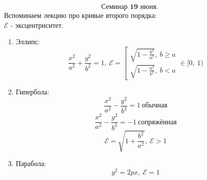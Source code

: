 \documentclass[12pt, letterpaper, twoside]{article}
\begin{document}
\[\textbf{Семинар 19 июня.}\]
Вспоминаем лекцию про кривые второго порядка:\\
$\mathcal{E}$ - эксцентриситет.
\begin{enumerate}
    \item Эллипс:
\[\frac{x^2}{a^2} + \frac{y^2}{b^2} = 1,\ \mathcal{E} = \left[ \begin{gathered}
    \sqrt{1 - \frac{b^2}{a^2}},\ b\geq a\\
    \sqrt{1 - \frac{a^2}{b^2}},\ b < a
\end{gathered}\right. \in [0,\ 1)\]
    \newpage
    \item Гипербола:
\[\frac{x^2}{a^2} - \frac{y^2}{b^2} = 1\ \text{обычная}\]
\[\frac{x^2}{a^2} - \frac{y^2}{b^2} = -1\ \text{сопряжённая}\]
\[\mathcal{E} = \sqrt{1 + \frac{b^2}{a^2}},\ \mathcal{E} > 1\]
    \item Парабола:
\[y^2 = 2px,\ \mathcal{E} = 1\]
\end{enumerate}
\end{document}
